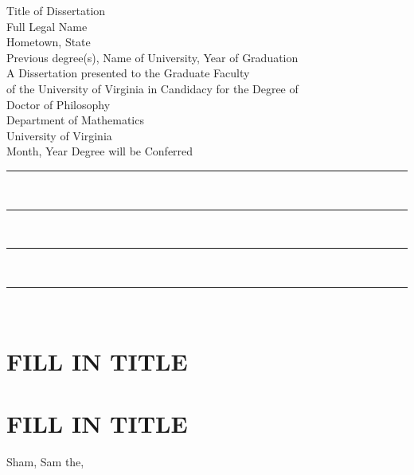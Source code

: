 \documentclass[12pt]{report}
\numberwithin{equation}{section}
\numberwithin{theorem}{section}
\newcommand{\dblsp}{\renewcommand{\baselinestretch}{2}\tiny\normalsize}
\newcommand{\sglsp}{\renewcommand{\baselinestretch}{1}\tiny\normalsize}
\begin{document}
\thispagestyle{empty}

\begin{center}

\vspace*{1in}

Title of Dissertation
\\[12mm]
Full Legal Name
\\
Hometown, State
\\[12mm]
Previous degree(s), Name of University, Year of Graduation
\\[22mm]
A Dissertation presented to the Graduate Faculty
\\
of the University of Virginia in Candidacy for the Degree of
\\
Doctor of Philosophy
\\[12mm]
Department of Mathematics
\\[8mm]
University of Virginia
\\
Month, Year Degree will be Conferred

\end{center}

\vfill

\begin{flushright}
\rule{6cm}{.01cm} \\[5mm]
\rule{6cm}{.01cm} \\[5mm]
\rule{6cm}{.01cm} \\[5mm]
\rule{6cm}{.01cm} \\[5mm]
\end{flushright}

\newpage

\dblsp
{}

\newpage


\tableofcontents {}
{\protect\thispagestyle{myheadings}\markright{}}


\newpage


\setcounter{page}{1}
\markright{}


\sglsp
\chapter{FILL IN TITLE}
\thispagestyle{myheadings}

\dblsp
\vspace*{-.65cm}




\sglsp
\chapter{FILL IN TITLE}
\thispagestyle{myheadings}

\dblsp
\vspace*{-.65cm}



\begin{thebibliography}{99}

\protect\thispagestyle{myheadings}\markright{}

\bibitem{}
Sham, Sam the, %

\end{thebibliography}
\end{document}
